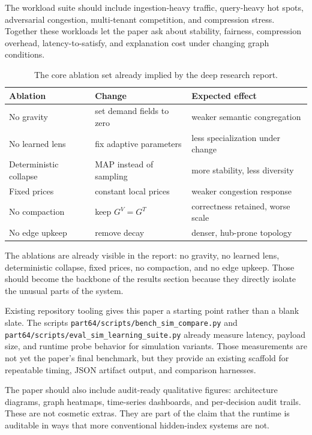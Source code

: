 The workload suite should include ingestion-heavy traffic, query-heavy hot spots, adversarial congestion, multi-tenant competition, and compression stress. Together these workloads let the paper ask about stability, fairness, compression overhead, latency-to-satisfy, and explanation cost under changing graph conditions.

\begin{table}[t]
\centering
\small
\begin{tabular}{lll}
\toprule
Ablation & Change & Expected effect \\
\midrule
No gravity & set demand fields to zero & weaker semantic congregation \\
No learned lens & fix adaptive parameters & less specialization under change \\
Deterministic collapse & MAP instead of sampling & more stability, less diversity \\
Fixed prices & constant local prices & weaker congestion response \\
No compaction & keep \(G^V = G^T\) & correctness retained, worse scale \\
No edge upkeep & remove decay & denser, hub-prone topology \\
\bottomrule
\end{tabular}
\caption{The core ablation set already implied by the deep research report.}
\end{table}

The ablations are already visible in the report: no gravity, no learned lens, deterministic collapse, fixed prices, no compaction, and no edge upkeep. Those should become the backbone of the results section because they directly isolate the unusual parts of the system.

Existing repository tooling gives this paper a starting point rather than a blank slate. The scripts \texttt{part64/scripts/bench\_sim\_compare.py} and \texttt{part64/scripts/eval\_sim\_learning\_suite.py} already measure latency, payload size, and runtime probe behavior for simulation variants. Those measurements are not yet the paper's final benchmark, but they provide an existing scaffold for repeatable timing, JSON artifact output, and comparison harnesses.

The paper should also include audit-ready qualitative figures: architecture diagrams, graph heatmaps, time-series dashboards, and per-decision audit trails. These are not cosmetic extras. They are part of the claim that the runtime is auditable in ways that more conventional hidden-index systems are not.

